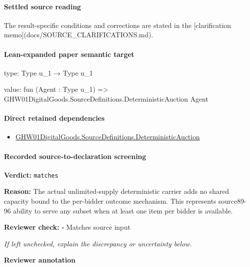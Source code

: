 \documentclass[10pt]{article}
\newcommand{\reviewerbox}{%
  \par\noindent\fbox{\parbox{0.96\linewidth}{\rule{0pt}{0.38in}}}\par
}
\newcommand{\reviewmatch}[1]{%
  \par\noindent\textbf{Reviewer check:} $\square$\; #1\par
  \noindent\emph{If left unchecked, explain the discrepancy or uncertainty below.}\par
}
\begin{document}
\paragraph{Settled source reading}
\begin{sloppypar}
The result-\allowbreak{}specific conditions and corrections are stated in the [clarification memo](docs/\allowbreak{}SOURCE\_\allowbreak{}CLARIFICATIONS.\allowbreak{}md).\allowbreak{}
\end{sloppypar}

\paragraph{Lean-expanded paper semantic target}
\begin{ReviewVerbatim}
type:
Type u_1 → Type u_1

value:
fun (Agent : Type u_1) => GHW01DigitalGoods.SourceDefinitions.DeterministicAuction Agent
\end{ReviewVerbatim}

\paragraph{Direct retained dependencies}
\begin{itemize}\raggedright
\item \hyperlink{paper-prerequisite-71190db14f40c12d}{GHW01\allowbreak{}Digital\allowbreak{}Goods.\allowbreak{}Source\allowbreak{}Definitions.\allowbreak{}Deterministic\allowbreak{}Auction}
\end{itemize}
\paragraph{Recorded source-to-declaration screening}
\textbf{Verdict:} \texttt{matches}
\\
{\raggedright
\textbf{Reason:} The actual unlimited-\allowbreak{}supply deterministic carrier adds no shared capacity bound to the per-\allowbreak{}bidder outcome mechanism.\allowbreak{} This represents source89-\allowbreak{}96 ability to serve any subset when at least one item per bidder is available.\allowbreak{}
\par}
\reviewmatch{Matches source input}
\noindent\textbf{Reviewer annotation}\par
\reviewerbox
\clearpage
\hypertarget{paper-prerequisite-34fbae4bd485e4c8}{}
\end{document}
